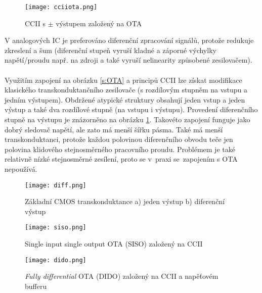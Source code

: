 \begin{figure}[h]
\centering
\texttt{[image: cciiota.png]}
\caption[CCII s $\pm$ výstupem založený na OTA]{CCII s $\pm$ výstupem založený na OTA \cite{15}}
\end{figure}
\newline
V analogových IC je preferováno diferenční zpracování signálů, protože redukuje zkreslení a šum (diferenční stupeň vyruší kladné a záporné výchylky napětí/proudu např. na zdroji a také vyruší nelinearity způsobené zesilovačem).\\
\\
Využitím zapojení na obrázku \ref{s:OTA} a principů CCII lze získat modifikace klasického transkonduktančního zesilovače (s rozdílovým stupněm na vstupu a jedním výstupem). Obdržené atypické struktury obsahují jeden vstup a jeden výstup a také dva rozdílové stupně (na vstupu i výstupu). Provedení diferenčního stupně na výstupu je znázorněno na obrázku \ref{s:CMOS}. Takovéto zapojení funguje jako dobrý sledovač napětí, ale zato má menší šířku pásma. Také má menší transkonduktanci, protože každou polovinou diferenčního obvodu teče jen polovina klidového stejnosměrného pracovního proudu. Problémem je také relativně nízké stejnosměrné zesílení, proto se v~praxi se~zapojením s OTA nepoužívá. \\
\begin{figure}[h]
\centering
\texttt{[image: diff.png]}
\caption[Základní CMOS transkonduktance a) jeden výstup b) diferenční výstup]{Základní CMOS transkonduktance a) jeden výstup b) diferenční výstup \cite{13} \label{s:CMOS}}
\end{figure}
\begin{figure}[h]
\centering
\texttt{[image: siso.png]}
\caption[Single input single output OTA (SISO) založený na CCII]{Single input single output OTA (SISO) založený na CCII \cite{15}}
\end{figure}
\begin{figure}[h]
\centering
\texttt{[image: dido.png]}
\caption[\textit{Fully differential} OTA (DIDO) založený na CCII a napěťovém bufferu]{\textit{Fully differential} OTA (DIDO) založený na CCII a napěťovém bufferu \cite{15}}
\end{figure}
\newpage
